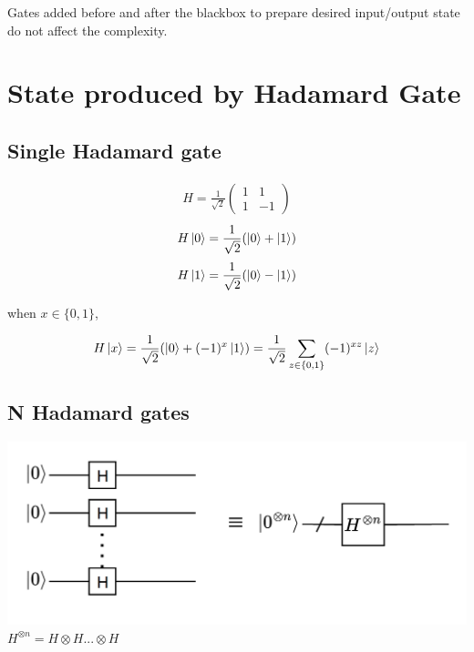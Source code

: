 \documentclass{article}
\begin{document}
Gates added before and after the blackbox to prepare desired input/output state do not affect the complexity. 

\section{State produced by Hadamard Gate}

\subsection{Single Hadamard gate}

\begin{gather*}
    H = \frac{1}{\sqrt{2}} 
    \begin{pmatrix}
    1 & 1\\
    1 & -1
    \end{pmatrix}
\end{gather*}
\begin{gather*}
    H \ket{0} = \frac{1}{\sqrt{2}} (\ket{0}+\ket{1})
\end{gather*}
\begin{gather*}
    H \ket{1} = \frac{1}{\sqrt{2}} (\ket{0}-\ket{1})
\end{gather*}

when $x \in \{0, 1\}$,

\begin{gather*}
    H \ket{x} = \frac{1}{\sqrt{2}} (\ket{0}+ (-1)^{x}\ket{1})
    =  \frac{1}{\sqrt{2}} \sum \limits _{z \in \{0,1\}} (-1)^{xz} \ket{z}
\end{gather*}

\subsection{N Hadamard gates}
\includegraphics[scale=0.3]{q4.png}
$H^{\otimes n} = H \otimes H ... \otimes H$
\end{document}
